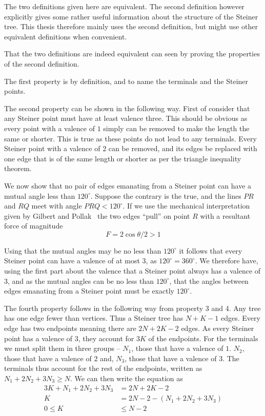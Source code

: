 The two definitions given here are equivalent.  The second definition however explicitly
gives some rather useful information about the structure of the Steiner
tree.  This thesis therefore mainly uses the second definition, but might
use other equivalent definitions when convenient.

That the two definitions are indeed equivalent can seen by proving the
properties of the second definition.

The first property is by definition, and to name the terminals and the
Steiner points.

The second property can be shown in the following way.  First of consider that
any Steiner point must have at least valence three.  This should be obvious as
every point with a valence of $1$ simply can be removed to make the length the
same or shorter.  This is true as these points do not lead to any terminals.
Every Steiner point with a valence of $2$ can be removed, and its edges be replaced
with one edge that is of the same length or shorter as per the triangle
inequality theorem.

We now show that no pair of edges emanating from a Steiner point can have a
mutual angle less than $120^{\circ}$.  Suppose the contrary is the true, and the
lines $PR$ and $RQ$ meet with angle $PRQ < 120^{\circ}$.  If we use the
mechanical interpretation given by Gilbert and Pollak~\cite{Gilbert1968} the two
edges ``pull'' on point $R$ with a resultant force of magnitude
%
\begin{equation}
F = 2 \cos \theta / 2 > 1
\end{equation}
%

Using that the mutual angles may be no less than $120^{\circ}$ it follows that
every Steiner point can have a valence of at most $3$, as
$120^{\circ} = 360^{\circ}$.  We therefore have, using the first part about the
valence that a Steiner point always has a valence of $3$, and as the mutual angles
can be no less than $120^{\circ}$, that the angles between edges emanating from
a Steiner point must be exactly $120^{\circ}$.


The fourth property follows in the following way from property 3 and 4.  Any
tree has one edge fewer than vertices.  Thus a Steiner tree has $N+K-1$ edges.
Every edge has two endpoints meaning there are $2N+2K-2$ edges.  As every
Steiner point has a valence of $3$, they account for $3K$ of the endpoints.  For
the terminals we must split them in three groups -- $N_1$, those that have a
valence of $1$.  $N_2$, those that have a valence of $2$ and, $N_3$, those that
have a valence of $3$.  The terminals thus account for the rest of the
endpoints, written as $N_1 + 2 N_2 + 3 N_3 \ge N$.  We can then write the
equation as
%
\begin{align}
  3K + N_1 + 2N_2 + 3N_3 &= 2N + 2K - 2 \\
  K &= 2N - 2 - (N_1 + 2N_2 + 3N_3) \\
  0 \le K &\le N - 2
\end{align}

